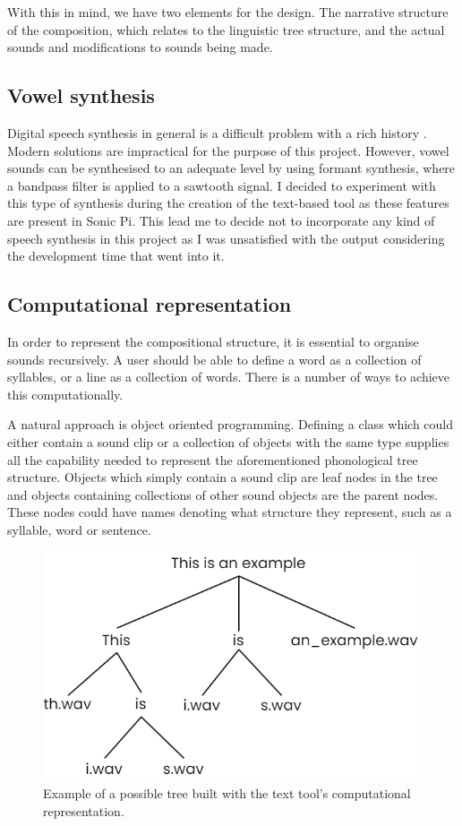\documentclass[12pt,a4paper,oneside,openright]{report}
\begin{document}
With this in mind, we have two elements for the design. The narrative structure of the composition, which relates to the linguistic tree structure, and the actual sounds and modifications to sounds being made.

\subsection{Vowel synthesis}
Digital speech synthesis in general is a difficult problem with a rich history \cite{Balyan13}. Modern solutions are impractical for the purpose of this project. However, vowel sounds can be synthesised to an adequate level by using formant synthesis, where a bandpass filter is applied to a sawtooth signal. I decided to experiment with this type of synthesis during the creation of the text-based tool as these features are present in Sonic Pi. This lead me to decide not to incorporate any kind of speech synthesis in this project as I was unsatisfied with the output considering the development time that went into it.

\subsection{Computational representation}\label{sec:comp_rep}
In order to represent the compositional structure, it is essential to organise sounds recursively. A user should be able to define a word as a collection of syllables, or a line as a collection of words. There is a number of ways to achieve this computationally.

A natural approach is object oriented programming. Defining a class which could either contain a sound clip or a collection of objects with the same type supplies all the capability needed to represent the aforementioned phonological tree structure. Objects which simply contain a sound clip are leaf nodes in the tree and objects containing collections of other sound objects are the parent nodes. These nodes could have names denoting what structure they represent, such as a syllable, word or sentence.

\begin{figure}[h!]
    \centering
    \includegraphics[scale=0.5]{images/tree_structure_example.png}
    \caption{Example of a possible tree built with the text tool's computational representation.}
    \label{fig:tree_struct_ex}
\end{figure}
\end{document}
